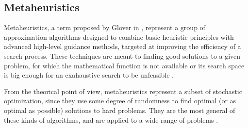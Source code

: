 \subsection{Metaheuristics}

Metaheuristics, a term proposed by Glover in \cite{Glover-Future_paths_for_integer_programming_and_links_to_artificial_intelligence:1986},
represent a group of approximation algorithms designed to combine
basic heuristic principles with advanced high-level guidance methods,
targeted at improving the efficiency of a search process. These techniques
are meant to finding good solutions to a given problem, for which
the mathematical function is not available or its search space is
big enough for an exahaustive search to be unfeasible \cite{Kochenberger_Handbook_of_metaheuristics:2003}.

From the theorical point of view, metaheuristics represent a subset
of stochastic optimization, since they use some degree of randomness
to find optimal (or as optimal as possible) solutions to hard problems.
They are the most general of these kinds of algorithms, and are applied
to a wide range of problems \cite{Luke-Essentials_of_metaheuristics:2009}.

